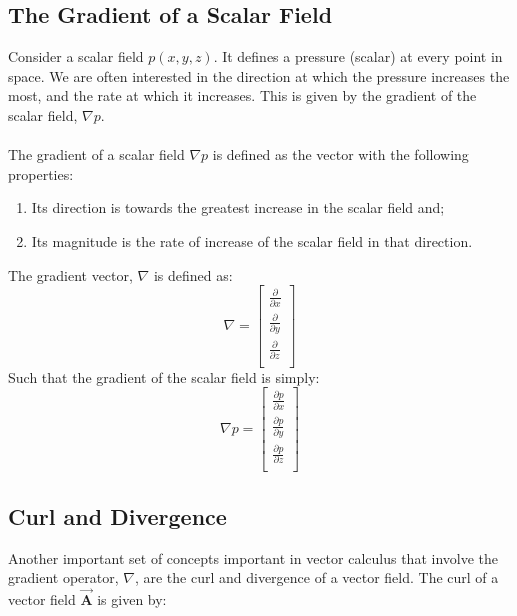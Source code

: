 \documentclass[11pt]{article}
\begin{document}
\subsection{The Gradient of a Scalar Field}
Consider a scalar field $p(x,y,z)$. It defines a pressure (scalar) at every point in space. We are often interested in the direction at which the pressure increases the most, and the rate at which it increases. This is given by the gradient of the scalar field, $\nabla p$. \\ \\
\noindent
The gradient of a scalar field $\nabla p$ is defined as the vector with the following properties:
\begin{enumerate}
    \item Its direction is towards the greatest increase in the scalar field and;
    \item Its magnitude is the rate of increase of the scalar field in that direction.
\end{enumerate}
\noindent
The gradient vector, $\nabla$ is defined as:
\begin{equation*}
    \nabla = \begin{bmatrix}
                \frac{\partial}{\partial x} \\
                \frac{\partial}{\partial y} \\
                \frac{\partial}{\partial z} \\     
                \end{bmatrix}
\end{equation*}
\noindent
Such that the gradient of the scalar field is simply:
\begin{equation*}
    \nabla p = \begin{bmatrix}
                \frac{\partial p}{\partial x} \\
                \frac{\partial p}{\partial y} \\
                \frac{\partial p}{\partial z} \\     
                \end{bmatrix}
\end{equation*}

\subsection{Curl and Divergence}
\noindent
Another important set of concepts important in vector calculus that involve the gradient operator, $\nabla$, are the curl and divergence of a vector field. The curl of a vector field $\vec{\bm{A}}$ is given by:
\end{document}
